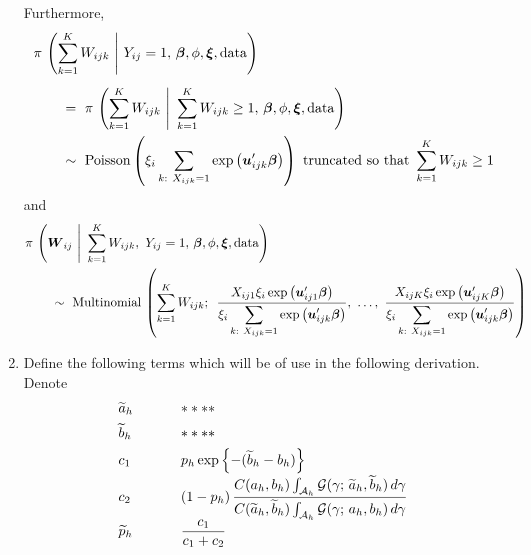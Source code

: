 \documentclass[11pt]{article}
\renewcommand{\vec}{\boldsymbol}
\newcommand{\barBBB}{~\Bigg|~}
\begin{document}
\begin{enumerate}[label=Step \arabic*., leftmargin=13mm]
Furthermore,
\begin{align*} \MoveEqLeft
\pi\,\left( \sum_{k=1}^K W_{ijk} \barBBB Y_{ij} = 1,\, \vec{\beta}, \phi, \vec{\xi}, \text{data} \right) \\[1ex]
&=~ \pi\,\left( \sum_{k=1}^K W_{ijk} \barBBB \sum_{k=1}^K W_{ijk} \geq 1,\, \vec{\beta}, \phi, \vec{\xi}, \text{data} \right) \\
&\sim~ \text{Poisson} \left( \xi_i \sum_{k{:}~ X_{ijk}=1} \exp \left(\vec{u}_{ijk}^\prime \vec{\beta}\right) \right) \text{ truncated so that } \sum_{k=1}^K W_{ijk} \geq 1
\end{align*}
and
\begin{align*} \MoveEqLeft
\pi\,\left( \vec{W}_{ij} \barBBB \sum_{k=1}^K W_{ijk},~  Y_{ij} = 1,\, \vec{\beta}, \phi, \vec{\xi}, \text{data} \right) \\
&\sim~ \text{Multinomial}\, \left( \sum_{k=1}^K W_{ijk};~\, \frac{ X_{ij1} \xi_i \exp \left(\vec{u}_{ij1}^\prime \vec{\beta} \right) }{ \displaystyle \xi_i \sum_{k{:}~ X_{ijk}=1} \exp \left(\vec{u}_{ijk}^\prime \vec{\beta}\right) },~ \dots,~ \frac{ X_{ijK} \xi_i \exp\left( \vec{u}_{ijK}^\prime \vec{\beta} \right) }{ \displaystyle \xi_i \sum_{k{:}~ X_{ijk}=1} \exp \left(\vec{u}_{ijk}^\prime \vec{\beta}\right) } \right)
\end{align*}




\item Define the following terms which will be of use in the following derivation.  Denote
\[ \begin{array}{lll}
\widetilde{a}_h & & **** \\[1ex]
\widetilde{b}_h & & **** \\[1ex]
c_1 & \hspace{5mm} & p_h \exp\left\{ -(\widetilde{b}_h - b_h) \right\} \\[1ex]
c_2 &  & \displaystyle (1 - p_h)\, \frac{ C(a_h,b_h) \int_{\mathcal{A}_h} \mathcal{G}(\gamma;\, \widetilde{a}_h, \widetilde{b}_h)\, d\gamma }{ C(\widetilde{a}_h, \widetilde{b}_h) \int_{\mathcal{A}_h} \mathcal{G}(\gamma;\, a_h, b_h)\, d\gamma } \\[1ex]
\widetilde{p}_h & & \displaystyle \frac{ c_1 }{ c_1 + c_2 }
\end{array} \]


\end{enumerate}
\end{document}
